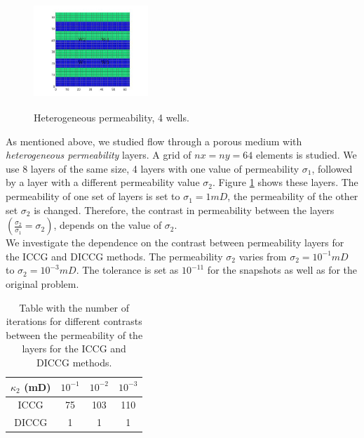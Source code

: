 \documentclass[12pt]{article}
\begin{document}
\begin{figure}
\centering 
\vspace{-10pt}
\includegraphics[width=4.3cm,height=4.3cm,keepaspectratio]{images_prev/perm_he_1.jpg}
 \vspace{-20pt}
\caption{ Heterogeneous permeability, 4 wells.}\label{fig:hep}
\vspace{-15pt}
\end{figure}

\normalsize
As mentioned above, we studied flow through a porous medium with \emph{heterogeneous permeability} layers. A grid of
$nx = ny = 64$ elements is studied. We use 8 layers of the same size, 
4 layers with one value of permeability $\sigma_1$, followed by a layer with a different permeability value $\sigma_2$. Figure \ref{fig:hep} shows these layers. The permeability of one set of layers is set to $\sigma_1=1mD$, the permeability of the other set $\sigma_2$ is changed. 
Therefore, the contrast in permeability between the layers $(\frac{\sigma_2}{\sigma_1}=\sigma_2)$,
depends on the value of $\sigma_2$.\\
We investigate the dependence on the contrast between permeability layers for the ICCG and DICCG methods.
The permeability  $\sigma_2$ varies from $\sigma_2=10^{-1}mD$ to $\sigma_2=10^{-3}mD$. 
 The tolerance is set as $10^{-11}$ for the snapshots as well as for the original problem.\\
\renewcommand{\arraystretch}{1.3}
\begin{table}[!ht]
\centering
\begin{minipage}{.65\textwidth}
\vspace{-20pt}
\centering
\begin{tabular}{ |c|c|c|c|} 
\hline
 $\kappa_2$ (mD) & $10^{-1}$& $10^{-2}$ & $10^{-3}$ \\
 \hline
  ICCG  & 75& 103&110\\ 
 
  DICCG  & 1 & 1& 1\\ 
 \hline
\end{tabular}
\caption{Table with the number of iterations for different contrasts between the permeability of the layers
for the ICCG and DICCG methods.}
\label{table:hei}
\end{minipage}
\vspace{-10pt}
\end{table}
\end{document}
